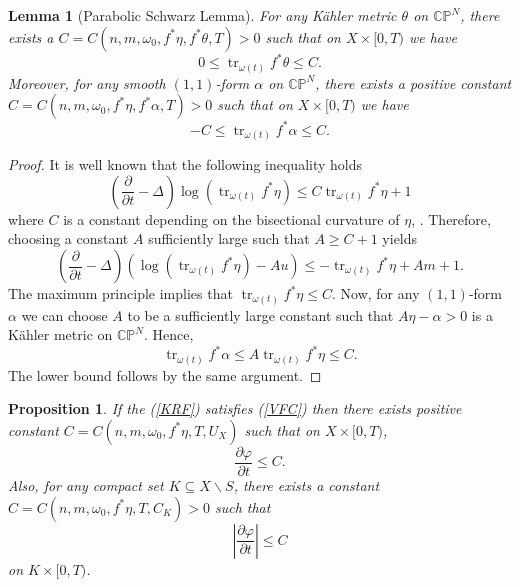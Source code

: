 \documentclass[12pt]{article}
\newtheorem{lemma}[theorem]{Lemma}
\newtheorem{proposition}[theorem]{Proposition}
\numberwithin{equation}{section}
\newcommand{\CP}{\mathbb{CP}}
\renewcommand{\d}{\partial}
\DeclareMathOperator{\tr}{tr}
\newcommand{\parabolic}[1]{\left(\frac{\d}{\d t} - \Delta_{#1}\right)}
\begin{document}
\begin{lemma}[Parabolic Schwarz Lemma] For any K\"ahler metric $\theta$ on $\CP^N$, there exists a $C = C(n,m,\omega_0, f^*\eta, f^*\theta, T)> 0$ such that on $X \times [0,T)$ we have
\begin{equation*}
    0 \leq \tr_{\omega(t)} f^* \theta \leq C.
\end{equation*}
Moreover, for any smooth $(1,1)$-form $\alpha$ on $\CP^N$, there exists a positive constant $C = C(n,m,\omega_0,f^*\eta,f^*\alpha,T) > 0$ such that on $X \times [0,T)$ we have
\begin{equation*}
    -C \leq \tr_{\omega(t)} f^* \alpha \leq C.
\end{equation*}
\end{lemma}

\begin{proof}
It is well known that the following inequality holds
\begin{equation*}
    \parabolic{} \log (\tr_{\omega(t)} f^* \eta) \leq C \tr_{\omega(t)} f^* \eta + 1
\end{equation*}
where $C$ is a constant depending on the bisectional curvature of $\eta$, \cite{ST07}. Therefore, choosing a constant $A$ sufficiently large such that $A \geq C + 1$ yields
\begin{equation*}
    \parabolic{} \left(\log (\tr_{\omega(t)} f^* \eta) - Au\right) \leq - \tr_{\omega(t)} f^* \eta +Am + 1.
\end{equation*}
The maximum principle implies that $\tr_{\omega(t)} f^* \eta \leq C$. Now, for any $(1,1)$-form $\alpha$ we can choose $A$ to be a sufficiently large constant such that $A\eta - \alpha > 0$ is a K\"ahler metric on $\CP^N$. Hence,
\begin{equation*}
    \tr_{\omega(t)} f^* \alpha \leq A \tr_{\omega(t)} f^* \eta \leq C.
\end{equation*}
The lower bound follows by the same argument.
\end{proof}

\begin{proposition}\label{dvarphi_dt_bound}
If the (\ref{KRF}) satisfies (\ref{VFC}) then there exists positive constant $C = C(n,m,\omega_0,f^*\eta,T,U_X)$ such that on $X \times [0,T)$,
\begin{equation*}
    \frac{\d \varphi}{\d t} \leq C.
\end{equation*}
Also, for any compact set $K \subseteq X \backslash S$, there exists a constant $C = C(n,m,\omega_0,f^*\eta,T,C_K) > 0$ such that
\begin{equation*}
    \left|\frac{\d \varphi}{\d t}\right| \leq C
\end{equation*}
on $K \times [0,T)$.
\end{proposition}
\end{document}
